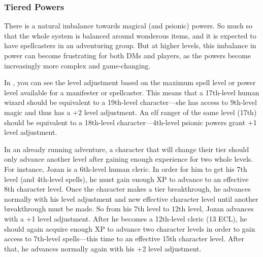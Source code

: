 \subsubsection{Tiered Powers}
There is a natural imbalance towards magical (and psionic) powers. So much so that the whole system is balanced around wonderous items, and it is expected to have spellcasters in an adventuring group. But at higher levels, this imbalance in power can become frustrating for both DMs and players, as the powers become increasingly more complex and game-changing.

In , you can see the level adjustment based on the maximum spell level or power level available for a manifester or spellcaster. This means that a 17th-level human wizard should be equivalent to a 19th-level character---she has access to 9th-level magic and thus has a +2 level adjustment. An elf ranger of the same level (17th) should be equivalent to a 18th-level character---4th-level psionic powers grant +1 level adjustment.


In an already running adventure, a character that will change their tier should only advance another level after gaining enough experience for two whole levels. For instance, Jozan is a 6th-level human cleric. In order for him to get his 7th level (and 4th-level spells), he must gain enough XP to advance to an effective 8th character level. Once the character makes a tier breakthrough, he advances normally with his level adjustment and new effective character level until another breakthrough must be made. So from his 7th level to 12th level, Jozan advances with a +1 level adjustment. After he becomes a 12th-level cleric (13 ECL), he should again acquire enough XP to advance two character levels in order to gain access to 7th-level spells---this time to an effective 15th character level. After that, he advances normally again with his +2 level adjustment.